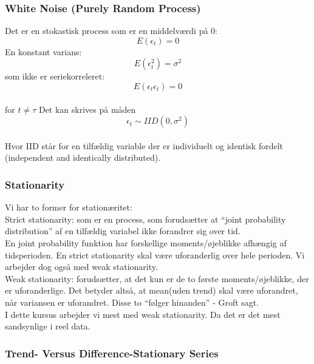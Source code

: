 \documentclass[
  10pt,
]{article}
\begin{document}
\hypertarget{white-noise-purely-random-process}{%
\subsubsection{White Noise (Purely Random
Process)}\label{white-noise-purely-random-process}}

Det er en stokastisk process som er en middelværdi på 0:
\[E(\epsilon_t) = 0\] En konstant varians: \[E(\epsilon_t^2)=\sigma^2\]
som ikke er seriekorreleret: \[E(\epsilon_t\epsilon_t)=0\]\\
for \(t\neq\tau\) Det kan skrives på måden\\
\[\epsilon_t \sim IID(0,\sigma^2)\]\\
Hvor IID står for en tilfældig variable der er individuelt og identisk
fordelt (independent and identically distributed).\\

\hypertarget{stationarity}{%
\subsubsection{Stationarity}\label{stationarity}}

Vi har to former for stationæritet:\\
Strict stationarity: som er en process, som forudsætter at ``joint
probability distribution'' af en tilfældig variabel ikke forandrer sig
over tid.\\

En joint probability funktion har forskellige moments/øjeblikke afhængig
af tidsperioden. En strict stationarity skal være uforanderlig over hele
perioden. Vi arbejder dog også med weak stationarity.\\

Weak stationarity: forudsætter, at det kun er de to første
moments/øjeblikke, der er uforanderlige. Det betyder altså, at mean(uden
trend) skal være uforandret, når variansen er uforandret. Disse to
``følger hinanden'' - Groft sagt.\\
I dette kursus arbejder vi mest med weak stationarity. Da det er det
mest sandsynlige i reel data.\\

\hypertarget{trend--versus-difference-stationary-series}{%
\subsubsection{Trend- Versus Difference-Stationary
Series}\label{trend--versus-difference-stationary-series}}
\end{document}
